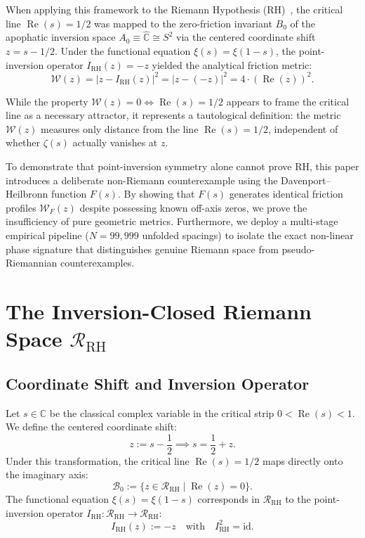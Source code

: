 \documentclass[11pt,a4paper]{article}
\numberwithin{table}{section}
\begin{document}
When applying this framework to the Riemann Hypothesis (RH)~\cite{riemann1859ueber},
the critical line $\operatorname{Re}(s) = 1/2$ was mapped to the zero-friction
invariant $B_0$ of the apophatic inversion space $A_0 \equiv \widehat{\mathbb{C}}
\cong S^2$ via the centered coordinate shift $z = s - 1/2$.
Under the functional equation $\xi(s) = \xi(1-s)$, the point-inversion operator
$I_{\text{RH}}(z) = -z$ yielded the analytical friction metric:
\begin{equation}
\mathcal{W}(z) = |z - I_{\text{RH}}(z)|^2 = |z - (-z)|^2 = 4 \cdot (\operatorname{Re}(z))^2 .
\end{equation}

While the property $\mathcal{W}(z) = 0 \iff \operatorname{Re}(s) = 1/2$ appears to
frame the critical line as a necessary attractor, it represents a tautological
definition: the metric $\mathcal{W}(z)$ measures only distance from the
line $\operatorname{Re}(s) = 1/2$, independent of whether $\zeta(s)$ actually
vanishes at $z$.

To demonstrate that point-inversion symmetry alone cannot prove RH, this paper
introduces a deliberate non-Riemann counterexample using the Davenport--Heilbronn
function $F(s)$.
By showing that $F(s)$ generates identical friction profiles $\mathcal{W}_F(z)$
despite possessing known off-axis zeros, we prove the insufficiency of pure
geometric metrics.
Furthermore, we deploy a multi-stage empirical pipeline ($N = 99{,}999$ unfolded
spacings) to isolate the exact non-linear phase signature that distinguishes
genuine Riemann space from pseudo-Riemannian counterexamples.

\section{The Inversion-Closed Riemann Space \texorpdfstring{$\mathcal{R}_{\text{RH}}$}{R\_RH}}

\subsection{Coordinate Shift and Inversion Operator}
Let $s \in \mathbb{C}$ be the classical complex variable in the critical
strip $0 < \operatorname{Re}(s) < 1$.
We define the centered coordinate shift:
\begin{equation}
z := s - \frac{1}{2} \implies s = \frac{1}{2} + z .
\end{equation}
Under this transformation, the critical line $\operatorname{Re}(s) = 1/2$
maps directly onto the imaginary axis:
\begin{equation}
\mathcal{B}_0 := \{ z \in \mathcal{R}_{\text{RH}} \mid \operatorname{Re}(z) = 0 \}.
\end{equation}
The functional equation $\xi(s) = \xi(1-s)$ corresponds in
$\mathcal{R}_{\text{RH}}$ to the point-inversion operator $I_{\text{RH}}:
\mathcal{R}_{\text{RH}} \to \mathcal{R}_{\text{RH}}$:
\begin{equation}
I_{\text{RH}}(z) := -z \quad \text{with} \quad I_{\text{RH}}^2 = \text{id}.
\end{equation}
\end{document}
